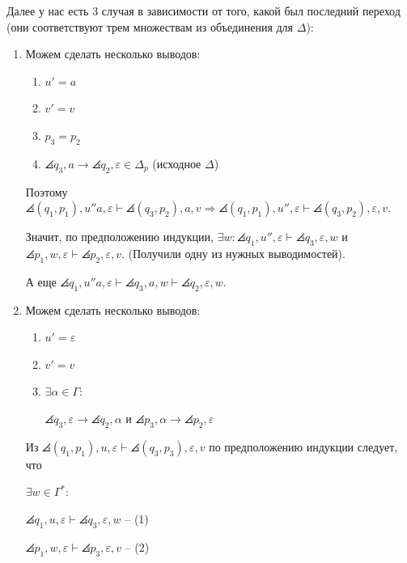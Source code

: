 Далее у нас есть 3 случая в зависимости от того, какой был последний переход (они соответствуют трем множествам из объединения для $\Delta$):

\begin{enumerate}
    \item Можем сделать несколько выводов:
    \begin{enumerate}
        \item $u' = a$
        \item $v' = v$
        \item $p_3 = p_2$
        \item $\angles{q_3, a} \rightarrow \angles{q_2, \varepsilon} \in \Delta_p$ (исходное $\Delta$)
    \end{enumerate}
    
    Поэтому $\angles{(q_1, p_1), u''a, \varepsilon} \vdash \angles{(q_3, p_2), a, v} \Rightarrow \angles{(q_1, p_1), u'', \varepsilon} \vdash \angles{(q_3, p_2), \varepsilon, v} $. 
    
    Значит, по предположению индукции, $\exists w: \angles{q_1, u'', \varepsilon} \vdash \angles{q_3, \varepsilon, w}$ и $\angles{p_1, w, \varepsilon} \vdash \angles{p_2, \varepsilon, v}$. (Получили одну из нужных выводимостей).
    
    А еще $\angles{q_1, u''a, \varepsilon} \vdash \angles{q_3, a, w} \vdash \angles{q_2, \varepsilon, w}$.
    
    \item Можем сделать несколько выводов:
    \begin{enumerate}
        \item $u' = \varepsilon$
        \item $v' = v$
        \item $\exists \alpha \in \Gamma:$ 
        
        $\angles{q_3, \varepsilon} \rightarrow \angles{q_2, \alpha}$ и $\angles{p_3, \alpha} \rightarrow \angles{p_2, \varepsilon}$
    \end{enumerate}
    
    Из $\angles{(q_1, p_1), u, \varepsilon} \vdash \angles{(q_3, p_3), \varepsilon, v}$ по предположению индукции следует, что
    
    $\exists w \in \Gamma^*:$
    
    $\angles{q_1, u, \varepsilon} \vdash \angles{q_3, \varepsilon, w}$ -- (1)
    
    $\angles{p_1, w, \varepsilon} \vdash \angles{p_3, \varepsilon, v}$ -- (2)
    

\end{enumerate}
